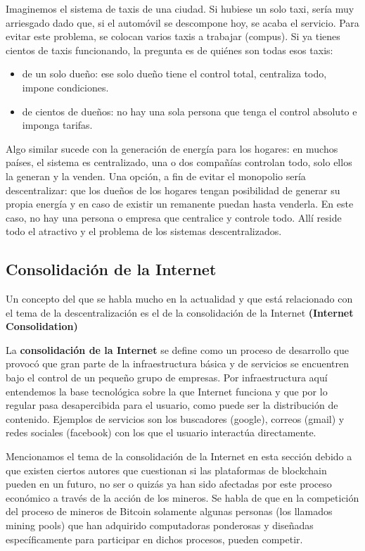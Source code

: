 \documentclass[12pt]{report} %
\begin{document}
\begin{itemize}
Imaginemos el sistema de taxis de una ciudad. Si hubiese un solo taxi, sería muy arriesgado dado que, si el automóvil se descompone hoy, se acaba el servicio. Para evitar este problema, se colocan varios taxis a trabajar (compus). Si ya tienes cientos de taxis funcionando, la pregunta es de quiénes son todas esos taxis:

\begin{itemize}
    \item de un solo dueño: ese solo dueño tiene el control total, centraliza todo, impone condiciones.
    \item de cientos de dueños: no hay una sola persona que tenga el control absoluto e imponga tarifas.
\end{itemize}

Algo similar sucede con la generación de energía para los hogares: en muchos países, el sistema es centralizado, una o dos compañías controlan todo, solo ellos la generan y la venden. Una opción, a fin de evitar el monopolio sería descentralizar: que los dueños de los hogares tengan posibilidad de generar su propia energía y en caso de existir un remanente puedan hasta venderla. En este caso, no hay una persona o empresa que centralice y controle todo. Allí reside todo el atractivo y el problema de los sistemas descentralizados.

\subsection{Consolidación de la Internet}

Un concepto del que se habla mucho en la actualidad y que está relacionado con el tema de la descentralización es el de la consolidación de la Internet \textbf{(Internet Consolidation)}

La \textbf{consolidación de la Internet} se define como un proceso de desarrollo que provocó que gran parte de la infraestructura básica y de servicios se encuentren bajo el control de un pequeño grupo de empresas. Por infraestructura aquí entendemos la base tecnológica sobre la que Internet funciona y que por lo regular pasa desapercibida para el usuario, como puede ser la distribución de contenido. Ejemplos de servicios son los buscadores (google), correos (gmail) y redes sociales (facebook) con los que el usuario interactúa directamente.

Mencionamos el tema de la consolidación de la Internet en esta sección debido a que existen ciertos autores que cuestionan si las plataformas de blockchain pueden en un futuro, no ser o quizás ya han sido afectadas por este proceso económico a través de la acción de los mineros.  Se habla de que en la competición del proceso de mineros de Bitcoin solamente algunas personas (los llamados mining pools) que han adquirido computadoras ponderosas y diseñadas específicamente para participar en dichos procesos, pueden competir.     


\end{itemize}
\end{document}
